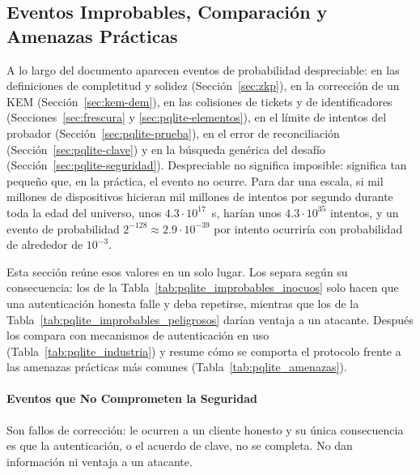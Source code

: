 \subsection{Eventos Improbables, Comparación y Amenazas Prácticas}
\label{sec:pqlite-improbables}

A lo largo del documento aparecen eventos de probabilidad despreciable: en las definiciones de completitud y solidez (Sección~\ref{sec:zkp}), en la corrección de un KEM (Sección~\ref{sec:kem-dem}), en las colisiones de tickets y de identificadores (Secciones~\ref{sec:frescura} y \ref{sec:pqlite-elementos}), en el límite de intentos del probador (Sección~\ref{sec:pqlite-prueba}), en el error de reconciliación (Sección~\ref{sec:pqlite-clave}) y en la búsqueda genérica del desafío (Sección~\ref{sec:pqlite-seguridad}). Despreciable no significa imposible: significa tan pequeño que, en la práctica, el evento no ocurre. Para dar una escala, si mil millones de dispositivos hicieran mil millones de intentos por segundo durante toda la edad del universo, unos $4.3 \cdot 10^{17}$~s, harían unos $4.3 \cdot 10^{35}$ intentos, y un evento de probabilidad $2^{-128} \approx 2.9 \cdot 10^{-39}$ por intento ocurriría con probabilidad de alrededor de $10^{-3}$.

Esta sección reúne esos valores en un solo lugar. Los separa según su consecuencia: los de la Tabla~\ref{tab:pqlite_improbables_inocuos} solo hacen que una autenticación honesta falle y deba repetirse, mientras que los de la Tabla~\ref{tab:pqlite_improbables_peligrosos} darían ventaja a un atacante. Después los compara con mecanismos de autenticación en uso (Tabla~\ref{tab:pqlite_industria}) y resume cómo se comporta el protocolo frente a las amenazas prácticas más comunes (Tabla~\ref{tab:pqlite_amenazas}).

\paragraph{Eventos que No Comprometen la Seguridad}
Son fallos de corrección: le ocurren a un cliente honesto y su única consecuencia es que la autenticación, o el acuerdo de clave, no se completa. No dan información ni ventaja a un atacante.

